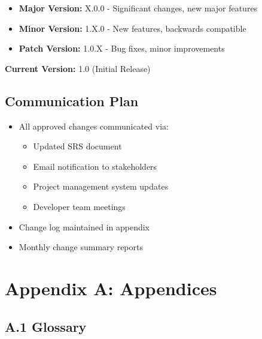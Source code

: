 \documentclass[12pt,a4paper]{article}
\begin{document}
\begin{itemize}
    \item \textbf{Major Version:} X.0.0 - Significant changes, new major features
    \item \textbf{Minor Version:} 1.X.0 - New features, backwards compatible
    \item \textbf{Patch Version:} 1.0.X - Bug fixes, minor improvements
\end{itemize}

\textbf{Current Version:} 1.0 (Initial Release)

\subsection{Communication Plan}

\begin{itemize}
    \item All approved changes communicated via:
    \begin{itemize}
        \item Updated SRS document
        \item Email notification to stakeholders
        \item Project management system updates
        \item Developer team meetings
    \end{itemize}
    \item Change log maintained in appendix
    \item Monthly change summary reports
\end{itemize}

\newpage

\section*{Appendix A: Appendices}

\subsection*{A.1 Glossary}
\end{document}
